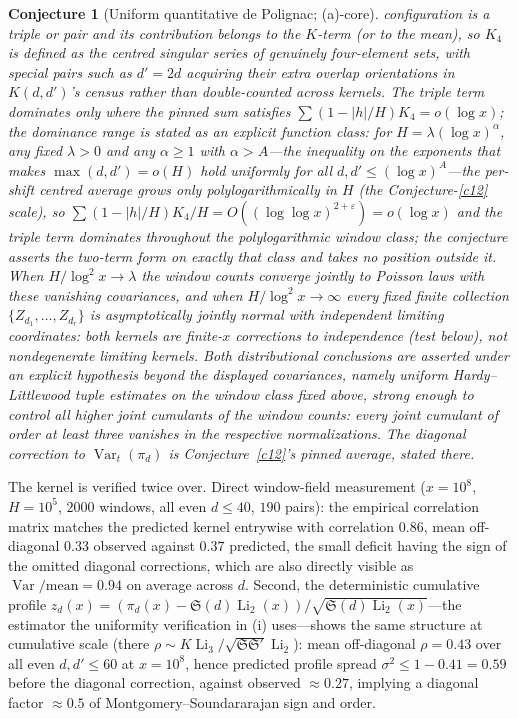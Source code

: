 \documentclass[11pt]{article}
\newtheorem{conjecture}{Conjecture}
\theoremstyle{definition}
\newcommand{\Li}{\operatorname{Li}}
\newcommand{\SG}{\mathfrak S}
\begin{document}
\begin{conjecture}[Uniform quantitative de Polignac;
(a)-core]
configuration is a triple or pair and its contribution belongs to
the $K$-term (or to the mean), so $K_4$ is defined as the centred
singular series of \emph{genuinely four-element} sets, with special
pairs such as $d'=2d$ acquiring their extra overlap orientations in
$K(d,d')$'s census rather than double-counted across kernels.  The
triple term dominates only
where the pinned sum satisfies $\sum(1-|h|/H)K_4=o(\log x)$; the
dominance range is stated as an explicit function class: for
$H=\lambda(\log x)^{\alpha}$, any
fixed $\lambda>0$ and any $\alpha\ge1$ with $\alpha>A$---the
inequality on the exponents that makes $\max(d,d')=o(H)$ hold
uniformly for all $d,d'\le(\log x)^{A}$---the per-shift centred average
grows only polylogarithmically in $H$ (the Conjecture-\ref{c12}
scale), so $\sum(1-|h|/H)K_4/H=O((\log\log x)^{2+\varepsilon})
=o(\log x)$ and the triple term dominates throughout the
polylogarithmic window class; the conjecture asserts the two-term
form on exactly that class and takes no position outside it.  When
$H/\log^2x\to\lambda$ the
window counts converge jointly to Poisson laws with these vanishing
covariances, and when $H/\log^2x\to\infty$ every fixed finite
collection $\{Z_{d_1},\dots,Z_{d_r}\}$ is asymptotically jointly
normal with \emph{independent} limiting coordinates: both kernels
are finite-$x$ corrections to independence (test below), not
nondegenerate limiting kernels.  Both distributional conclusions are
asserted under an explicit hypothesis beyond the displayed
covariances, namely uniform Hardy--Littlewood tuple estimates on the
window class fixed above, strong enough to control all higher joint
cumulants of the window counts: every joint cumulant of order at
least three vanishes in the respective normalizations.  The diagonal
correction to
$\operatorname{Var}_t(\pi_d)$ is Conjecture~\ref{c12}'s pinned
average, stated there.
\end{conjecture}

The kernel is verified twice over.  Direct window-field measurement
($x=10^8$, $H=10^5$, $2000$ windows, all even $d\le40$, $190$
pairs): the empirical correlation matrix matches the predicted kernel
entrywise with correlation $0.86$, mean off-diagonal $0.33$ observed
against $0.37$ predicted, the small deficit having the sign of the
omitted diagonal corrections, which are also directly visible as
$\operatorname{Var}/\text{mean}=0.94$ on average across $d$.
Second, the deterministic cumulative profile
$z_d(x)=(\pi_d(x)-\SG(d)\Li_2(x))/\sqrt{\SG(d)\Li_2(x)}$---the
estimator the uniformity verification in (i) uses---shows the same
structure at cumulative scale (there
$\rho\sim K\Li_3/\sqrt{\SG\SG'}\Li_2$): mean off-diagonal $\rho=0.43$
over all even $d,d'\le60$ at $x=10^8$, hence predicted profile spread
$\sigma^2\le1-0.41=0.59$ before the diagonal correction, against
observed ${\approx}0.27$, implying a diagonal factor ${\approx}0.5$
of Montgomery--Soundararajan sign and order.
\end{document}

